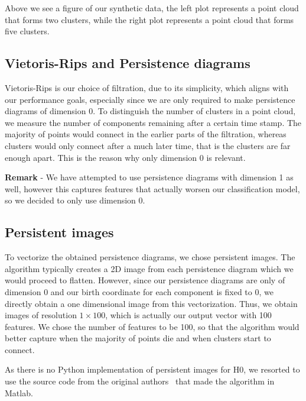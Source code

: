 \documentclass{article}
\begin{document}
Above we see a figure of our synthetic data, the left plot represents a point cloud that forms two clusters, while the right plot represents a point cloud that forms five clusters.


\subsection{Vietoris-Rips and Persistence diagrams}
Vietoris-Rips is our choice of filtration, due to its simplicity, which aligns with our performance goals, especially since we are only required to make persistence diagrams of dimension 0. To distinguish the number of clusters in a point cloud, we measure the number of components remaining after a certain time stamp. The majority of points would connect in the earlier parts of the filtration, whereas clusters would only connect after a much later time, that is the clusters are far enough apart. This is the reason why only dimension 0 is relevant.

\textbf{Remark} - We have attempted to use persistence diagrams with dimension 1 as well, however this captures features that actually worsen our classification model, so we decided to only use dimension 0.


\subsection{Persistent images}
To vectorize the obtained persistence diagrams, we chose persistent images. The algorithm typically creates a 2D image from each persistence diagram which we would proceed to flatten. However, since our persistence diagrams are only of dimension 0 and our birth coordinate for each component is fixed to 0, we directly obtain a one dimensional image from this vectorization. Thus, we obtain images of resolution $1 \times 100$, which is actually our output vector with 100 features. We chose the number of features to be 100, so that the algorithm would better capture when the majority of points die and when clusters start to connect.

As there is no Python implementation of persistent images for H0, we resorted to use the source code from the original authors~\cite{PIarticle} that made the algorithm in Matlab.
\end{document}
